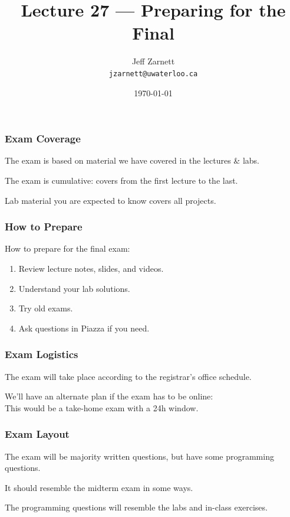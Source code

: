 

\title{Lecture 27 --- Preparing for the Final }

\author{Jeff Zarnett \\ \small \texttt{jzarnett@uwaterloo.ca}}
\date{\today}




\begin{frame}
  \titlepage

\end{frame}

\begin{frame}
\frametitle{Exam Coverage}

The exam is based on material we have covered in the lectures \& labs.

The exam is cumulative: covers from the first lecture to the last.

Lab material you are expected to know covers all projects.

\end{frame}

\begin{frame}
\frametitle{How to Prepare}

How to prepare for the final exam:

\begin{enumerate}
	\item Review lecture notes, slides, and videos.
	\item Understand your lab solutions.
	\item Try old exams.
	\item Ask questions in Piazza if you need.
\end{enumerate}

\end{frame}


\begin{frame}
\frametitle{Exam Logistics}

The exam will take place according to the registrar's office schedule.

We'll have an alternate plan if the exam has to be online:\\
\quad This would be a take-home exam with a 24h window.

\end{frame}


\begin{frame}
\frametitle{Exam Layout}

The exam will be majority written questions, but have some programming questions.

It should resemble the midterm exam in some ways.

The programming questions will resemble the labs and in-class exercises.

\end{frame}


